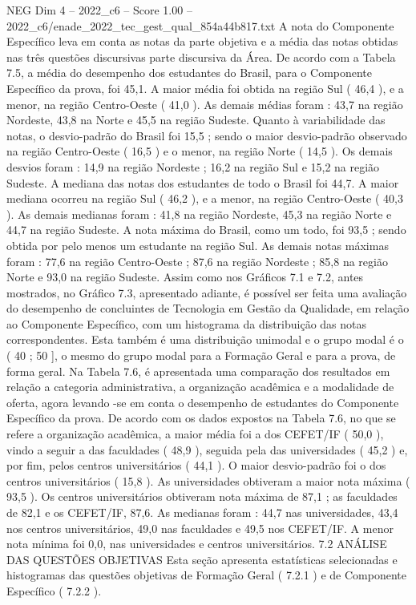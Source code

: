 \begin{textsample}{NEG Dim 4 – 2022\_c6 – Score 1.00 – 2022\_c6/enade\_2022\_tec\_gest\_qual\_854a44b817.txt}
A nota do Componente Específico leva em conta as notas da parte objetiva e a média das notas obtidas nas três questões discursivas parte discursiva da Área.
De acordo com a Tabela 7.5, a média do desempenho dos estudantes do Brasil, para o Componente Específico da prova, foi 45,1.
A maior média foi obtida na região Sul ( 46,4 ), e a menor, na região Centro-Oeste ( 41,0 ).
As demais médias foram : 43,7 na região Nordeste, 43,8 na Norte e 45,5 na região Sudeste.
Quanto à variabilidade das notas, o desvio-padrão do Brasil foi 15,5 ; sendo o maior desvio-padrão observado na região Centro-Oeste ( 16,5 ) e o menor, na região Norte ( 14,5 ).
Os demais desvios foram : 14,9 na região Nordeste ; 16,2 na região Sul e 15,2 na região Sudeste.
A mediana das notas dos estudantes de todo o Brasil foi 44,7.
A maior mediana ocorreu na região Sul ( 46,2 ), e a menor, na região Centro-Oeste ( 40,3 ).
As demais medianas foram : 41,8 na região Nordeste, 45,3 na região Norte e 44,7 na região Sudeste.
A nota máxima do Brasil, como um todo, foi 93,5 ; sendo obtida por pelo menos um estudante na região Sul.
As demais notas máximas foram : 77,6 na região Centro-Oeste ; 87,6 na região Nordeste ; 85,8 na região Norte e 93,0 na região Sudeste.
Assim como nos Gráficos 7.1 e 7.2, antes mostrados, no Gráfico 7.3, apresentado adiante, é possível ser feita uma avaliação do desempenho de concluintes de Tecnologia em Gestão da Qualidade, em relação ao Componente Específico, com um histograma da distribuição das notas correspondentes.
Esta também é uma distribuição unimodal e o grupo modal é o ( 40 ; 50 ], o mesmo do grupo modal para a Formação Geral e para a prova, de forma geral.
Na Tabela 7.6, é apresentada uma comparação dos resultados em relação a categoria administrativa, a organização acadêmica e a modalidade de oferta, agora levando -se em conta o desempenho de estudantes do Componente Específico da prova.
De acordo com os dados expostos na Tabela 7.6, no que se refere a organização acadêmica, a maior média foi a dos CEFET/IF ( 50,0 ), vindo a seguir a das faculdades ( 48,9 ), seguida pela das universidades ( 45,2 ) e, por fim, pelos centros universitários ( 44,1 ).
O maior desvio-padrão foi o dos centros universitários ( 15,8 ).
As universidades obtiveram a maior nota máxima ( 93,5 ).
Os centros universitários obtiveram nota máxima de 87,1 ; as faculdades de 82,1 e os CEFET/IF, 87,6.
As medianas foram : 44,7 nas universidades, 43,4 nos centros universitários, 49,0 nas faculdades e 49,5 nos CEFET/IF.
A menor nota mínima foi 0,0, nas universidades e centros universitários. 7.2 ANÁLISE DAS QUESTÕES OBJETIVAS Esta seção apresenta estatísticas selecionadas e histogramas das questões objetivas de Formação Geral ( 7.2.1 ) e de Componente Específico ( 7.2.2 ).

\end{textsample}
